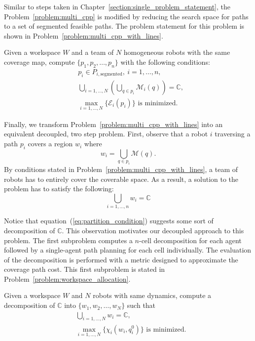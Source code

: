 \documentclass[../main.tex]{subfiles}
\begin{document}
Similar to steps taken in Chapter~\ref{section:single_problem_statement}, the Problem~\ref{problem:multi_cpp} is modified by reducing the search space for paths to a set of segmented feasible paths. The problem statement for this problem is shown in Problem~\ref{problem:multi_cpp_with_lines}.
\begin{problem}
\label{problem:multi_cpp_with_lines}
	Given a workspace $W$ and a team of $N$ homogeneous robots with the same coverage map, compute $\{p_1,p_2,\ldots,p_n\}$ with the following conditions:
	\begin{equation}
	\begin{aligned}
		& p_i\in P_{i,\text{segmented}},\ i=1,\dots,n,\\
		& \bigcup_{i=1,\dots,N}\left(\bigcup_{q\in p_i}\mathcal{M}_i(q)\right)=\mathbb{C},\\
		& \max_{i=1,\ldots,N}\{\mathcal{E}_i(p_i)\}\text{ is minimized.}
	\end{aligned}
	\end{equation}
\end{problem}

Finally, we transform Problem~\ref{problem:multi_cpp_with_lines} into an equivalent decoupled, two step problem. First, observe that a robot $i$ traversing a path $p_i$ covers a region $w_i$ where
\begin{equation}
	w_i=\bigcup_{q\in p_i}\mathcal{M}(q).
\end{equation}
By conditions stated in Problem~\ref{problem:multi_cpp_with_lines}, a team of robots has to entirely cover the coverable space. As a result, a solution to the problem has to satisfy the following:
\begin{equation}
	\label{eq:partition_condition}
	\bigcup_{i=1,\ldots,n}w_i=\mathbb{C}
\end{equation}

Notice that equation~(\ref{eq:partition_condition}) suggests some sort of decomposition of $\mathbb{C}$.
This observation motivates our decoupled approach to this problem. The first subproblem computes a $n$-cell decomposition for each agent followed by a single-agent path planning for each cell individually. The evaluation of the decomposition is performed with a metric designed to approximate the coverage path cost. This first subproblem is stated in Problem~\ref{problem:workspace_allocation}.

\begin{problem}
\label{problem:workspace_allocation}
	Given a workspace $W$ and $N$ robots with same dynamics, compute a decomposition of $\mathbb{C}$ into $\{w_1,w_2,\dots,w_N\}$ such that
	\begin{equation}
	\begin{aligned}
		& \bigcup_{i=1,\dots,N}w_i=\mathbb{C},\\
		& \max_{i=1,\ldots,N}\{\chi_i(w_i,q^0_i)\}\text{ is minimized.}
	\end{aligned}
	\end{equation}
\end{problem}
\end{document}
